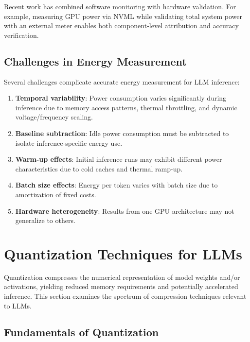 \documentclass[11pt]{article}
\begin{document}
Recent work has combined software monitoring with hardware validation. For example, measuring GPU power via NVML while validating total system power with an external meter enables both component-level attribution and accuracy verification.

\subsection{Challenges in Energy Measurement}

Several challenges complicate accurate energy measurement for LLM inference:

\begin{enumerate}
    \item \textbf{Temporal variability}: Power consumption varies significantly during inference due to memory access patterns, thermal throttling, and dynamic voltage/frequency scaling.
    
    \item \textbf{Baseline subtraction}: Idle power consumption must be subtracted to isolate inference-specific energy use.
    
    \item \textbf{Warm-up effects}: Initial inference runs may exhibit different power characteristics due to cold caches and thermal ramp-up.
    
    \item \textbf{Batch size effects}: Energy per token varies with batch size due to amortization of fixed costs.
    
    \item \textbf{Hardware heterogeneity}: Results from one GPU architecture may not generalize to others.
\end{enumerate}

\section{Quantization Techniques for LLMs}
\label{sec:quantization}

Quantization compresses the numerical representation of model weights and/or activations, yielding reduced memory requirements and potentially accelerated inference. This section examines the spectrum of compression techniques relevant to LLMs.

\subsection{Fundamentals of Quantization}
\end{document}
